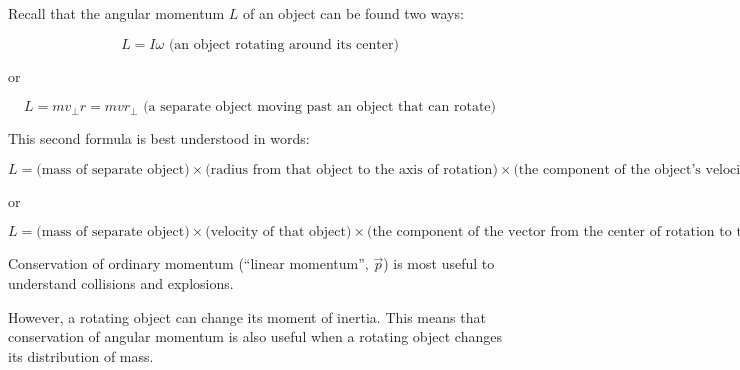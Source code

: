 \documentclass[12pt]{article}
\begin{document}
\Large
\centerline{}

\normalsize
\centerline{}

Recall that the angular momentum $L$ of an object can be found two ways:

$$L = I \omega \text{ (an object rotating around its center)}$$

or

$$L = mv_\perp r = mvr_\perp \text{ (a separate object moving past an object that can rotate)}$$

This second formula is best understood in words:

$$ L = \text{(mass of separate object)} \times \text{(radius from that object to the axis of rotation)} \times \text{(the component of the object's velocity perpendicular to the radius)} $$

or

$$ L = \text{(mass of separate object)} \times \text{(velocity of that object)} \times \text{(the component of the vector from the center of rotation to the object which is perpendicular to the velocity)} $$
\bigskip\bigskip



Conservation of ordinary momentum (``linear momentum'', $\vec p$) is most useful to understand collisions and explosions.

\bigskip

However, a rotating object can change its moment of inertia. This means that conservation of angular momentum is also useful when a rotating object changes its distribution of mass.

\newpage
\end{document}
